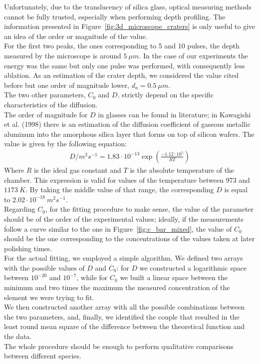  Unfortunately, due to the translucency of silica glass, optical measuring methods cannot be fully trusted, especially when performing depth profiling. The information presented in Figure~\ref{fig:3d_microscope_craters} is only useful to give an idea of the order or magnitude of the value.
 \\
For the first two peaks, the ones corresponding to 5 and 10 pulses, the depth measured by the microscope is around $5 \: \mu m$. In the case of our experiments the energy was the same but only one pulse was performed, with consequently less ablation. As an estimation of the crater depth, we considered the value cited before but one order of magnitude lower, $d_a = 0.5 \: \mu m$.
\\
The two other parameters, $C_0$ and $D$, strictly depend on the specific characteristics of the diffusion.
\\
The order of magnitude for $D$ in glasses can be found in literature; in Kawagishi et al. (1998)\cite{rathoreProceedingsSymposiumInterconnect1998} there is an estimation of the diffusion coefficient of gaseous metallic aluminum into the amorphous silica layer that forms on top of silicon wafers. The value is given by the following equation:
\begin{align}
    D/m^2s^{-1} = 1.83 \cdot 10^{-13}\exp \left(\frac{-1.12 \cdot 10^5}{RT}\right) \label{eq:diffiusion_coef_aluminum}
\end{align}
Where $R$ is the ideal gas constant and $T$ is the absolute temperature of the chamber. This expression is valid for values of the temperature between 973 and $1173 \:K$. By taking the middle value of that range, the corresponding $D$ is equal to $2.02 \cdot 10^{-18} \:m^2s^{-1}$.
\\
Regarding $C_0$, for the fitting procedure to make sense, the value of the parameter should be of the order of the experimental values; ideally, if the measurements follow a curve similar to the one in Figure~\ref{fig:c_bar_mixed}, the value of $C_0$ should be the one corresponding to the concentrations of the values taken at later polishing times.
\\
For the actual fitting, we employed a simple algorithm. We defined two arrays with the possible values of $D$ and $C_0$: for $D$ we constructed a logarithmic space between $10^{-20}$ and $10^{-7}$, while for $C_0$ we built a linear space between the minimum and two times the maximum the measured concentration of the element we were trying to fit.
\\
We then constructed another array with all the possible combinations between the two parameters, and, finally, we identified the couple that resulted in the least round mean square of the difference between the theoretical function and the data.
\\
The whole procedure should be enough to perform qualitative comparisons between different species.





